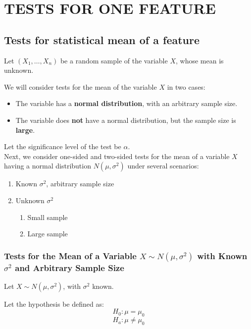 \documentclass[a4paper, 12pt]{article}
\begin{document}
\newpage
\section{TESTS FOR ONE FEATURE}

\subsection{Tests for statistical mean of a feature}

Let $(X_1, \ldots, X_n)$ be a random sample of the variable $X$, whose mean is unknown.

We will consider tests for the mean of the variable $X$ in two cases:

\begin{itemize}
    \item The variable has a \textbf{normal distribution}, with an arbitrary sample size.
    \item The variable does \textbf{not} have a normal distribution, but the sample size is \textbf{large}.
\end{itemize}

Let the significance level of the test be $\alpha$.\\


Next, we consider one-sided and two-sided tests for the mean
of a variable $X$ having a normal distribution $N(\mu, \sigma^2)$ under
several scenarios:

\begin{enumerate}
    \item Known $\sigma^2$, arbitrary sample size
    \item Unknown $\sigma^2$
    \begin{enumerate}
        \item Small sample
        \item Large sample
    \end{enumerate}
\end{enumerate}


\subsubsection{Tests for the Mean of a Variable $X \sim N(\mu, \sigma^2)$
with Known $\sigma^2$ and Arbitrary Sample Size}


Let $X \sim N(\mu, \sigma^2)$, with $\sigma^2$ known.  

Let the hypothesis be defined as:
\[
H_0: \mu = \mu_0
\]
\[
H_a: \mu \neq \mu_0
\]
\end{document}
